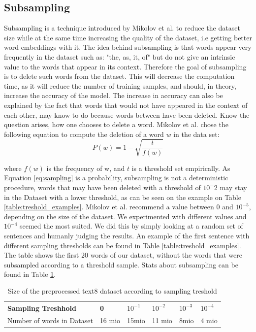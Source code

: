  
\subsection{Subsampling}
Subsampling is a technique introduced by Mikolov et al. \cite{mikolov} to reduce the dataset size while at the same time increasing the quality of the dataset, i.e getting better word embeddings with it. The idea behind subsampling is that words appear very frequently in the dataset such as: "the, as, it, of" but do not give an intrinsic value to the words that appear in its context. Therefore the goal of subsampling is to delete such words from the dataset. This will decrease the computation time, as it will reduce the number of training samples, and should, in theory, increase the accuracy of the model. The increase in accuracy can also be explained by the fact that words that would not have appeared in the context of each other, may know to do because words between have been deleted.
Know the question arises, how one chooses to delete a word. Mikolov et al. chose the following equation to compute the deletion of a word $w$ in the data set:
\begin{equation} \label{eq:sampling}
P(w) = 1- \sqrt{{\frac{t}{f(w)}}}
\end{equation}

where $f(w)$ is the frequency of w, and $t$ is a threshold set empirically. As Equation \ref{eq:sampling} is a probability, subsampling is not a deterministic procedure, words that may have been deleted with a threshold of $10^-2$ may stay in the Dataset with a lower threshold, as can be seen on the example on Table \ref{table:treshold_examples}. Mikolov et al. recommend a value between $0$ and $10^{-5}$, depending on the size of the dataset. We experimented with different values and $10^{-4}$ seemed the most suited. We did this by simply looking at a random set of sentences and humanly judging the results. An example of the first sentence with different sampling thresholds can be found in Table \ref{table:treshold_examples}. The table shows the first 20 words of our dataset, without the words that were subsampled according to a threshold sample. Stats about subsampling can be found in Table \ref{table:treshold}. 
\begin{table}[h]
\centering
\begin{tabular}{|l|l|l|l|l|l|}
\hline
Sampling Treshhold &  0      &      $ 10^{-1}$&$   10^{-2}$& $10^{-3}     $ &$10^{-4}   $    \\ \hline
Number of words in Dataset    & 16 mio & 15mio & 11 mio & 8mio & 4 mio \\ \hline
\end{tabular}
\caption{Size of the preprocessed text8 dataset according to sampling treshold}
\label{table:treshold}
\end{table}

